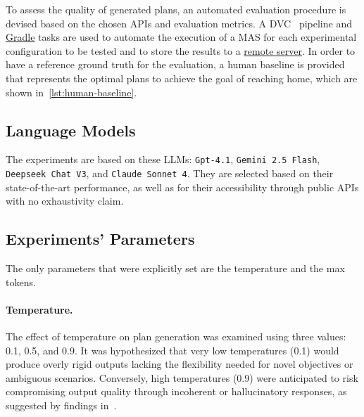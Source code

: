 \documentclass[12pt,a4paper,openright,twoside]{book}
\begin{document}
To assess the quality of generated plans, an automated evaluation procedure is devised based on the chosen APIs and evaluation metrics.
%
A DVC~\cite{ruslan_kuprieiev_2025_15646974} pipeline and \href{https://gradle.org/}{Gradle} tasks are used to automate the execution of a MAS for each experimental configuration to be tested and to store the results to a \href{https://dagshub.com/rbattistini/plan-generation-experiments}{remote server}.
%
In order to have a reference ground truth for the evaluation, a human baseline is provided that represents the optimal plans to achieve the goal of reaching home, which are shown in~\cref{lst:human-baseline}.



\subsection{Language Models}\label{sec:chosen-llms}

The experiments are based on these \ac{LLM}s: \texttt{Gpt-4.1}, \texttt{Gemini 2.5 Flash}, \texttt{Deepseek Chat V3}, and \texttt{Claude Sonnet 4}.
%
They are selected based on their state-of-the-art performance, as well as for their accessibility through public APIs with no exhaustivity claim.

\subsection{Experiments' Parameters}\label{sec:generation-parameters}

The only parameters that were explicitly set are the temperature and the max tokens.

\paragraph{Temperature.}  The effect of temperature on plan generation was examined using three values: 0.1, 0.5, and 0.9. 
%
It was hypothesized that very low temperatures (0.1) would produce overly rigid outputs lacking the flexibility needed for novel objectives or ambiguous scenarios.
%
Conversely, high temperatures (0.9) were anticipated to risk compromising output quality through incoherent or hallucinatory responses, as suggested by findings in~\cite{holtzmanCuriousCaseNeural2020}.
\end{document}
